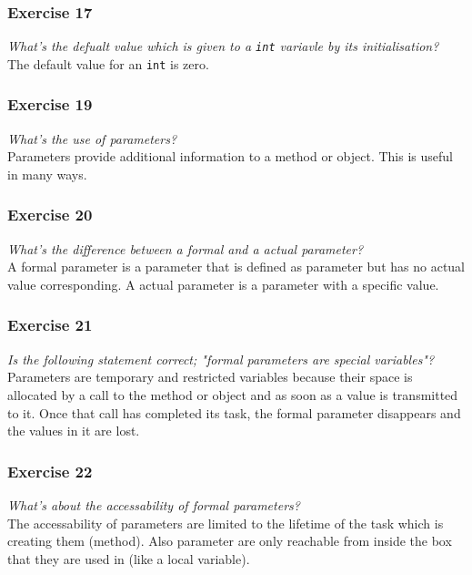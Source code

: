 \subsubsection*{Exercise 17}
\textit{What's the defualt value which is given to a \lstinline{int} variavle
	by its initialisation?}\\

The default value for an \lstinline{int} is zero.

\subsubsection*{Exercise 19}
\textit{What's the use of parameters?}\\

Parameters provide additional information to a method or object. This is
useful in many ways.

\subsubsection*{Exercise 20}
\textit{What's the difference between a formal and a actual parameter?}\\

A formal parameter is a parameter that is defined as parameter but has no 
actual value corresponding. A actual parameter is a parameter with a 
specific value.

\subsubsection*{Exercise 21}
\textit{Is the following statement correct; "formal parameters are special
	variables"?}\\

Parameters are temporary and restricted variables because their space is
allocated by a call to the method or object and as soon as a value is 
transmitted to it. Once that call has completed its task, the formal
parameter disappears and the values in it are lost.

\subsubsection*{Exercise 22}
\textit{What's about the accessability of formal parameters?}\\

The accessability of parameters are limited to the lifetime of the task
which is creating them (method). Also parameter are only reachable from
inside the box that they are used in (like a local variable).

